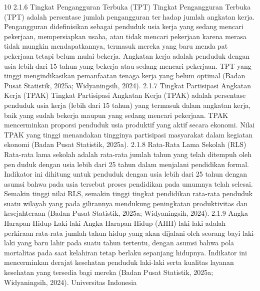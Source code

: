 10
2.1.6 Tingkat Pengangguran Terbuka (TPT)
Tingkat Pengangguran Terbuka (TPT) adalah persentase jumlah pengangguran terhadap jumlah angkatan kerja. Pengangguran didefinisikan sebagai penduduk usia kerja
yang sedang mencari pekerjaan, mempersiapkan usaha, atau tidak mencari pekerjaan
karena merasa tidak mungkin mendapatkannya, termasuk mereka yang baru mendapat pekerjaan tetapi belum mulai bekerja. Angkatan kerja adalah penduduk dengan
usia lebih dari 15 tahun yang bekerja atau sedang mencari pekerjaan. TPT yang tinggi
mengindikasikan pemanfaatan tenaga kerja yang belum optimal (Badan Pusat Statistik,
2025a; Widyaningsih, 2024).
2.1.7 Tingkat Partisipasi Angkatan Kerja (TPAK)
Tingkat Partisipasi Angkatan Kerja (TPAK) adalah persentase penduduk usia kerja
(lebih dari 15 tahun) yang termasuk dalam angkatan kerja, baik yang sudah bekerja maupun
yang sedang mencari pekerjaan. TPAK mencerminkan proporsi penduduk usia produktif
yang aktif secara ekonomi. Nilai TPAK yang tinggi menandakan tingginya partisipasi
masyarakat dalam kegiatan ekonomi (Badan Pusat Statistik, 2025a).
2.1.8 Rata-Rata Lama Sekolah (RLS)
Rata-rata lama sekolah adalah rata-rata jumlah tahun yang telah ditempuh oleh penduduk dengan usia lebih dari 25 tahun dalam menjalani pendidikan formal. Indikator
ini dihitung untuk penduduk dengan usia lebih dari 25 tahun dengan asumsi bahwa pada
usia tersebut proses pendidikan pada umumnya telah selesai. Semakin tinggi nilai RLS,
semakin tinggi tingkat pendidikan rata-rata penduduk suatu wilayah yang pada gilirannya
mendukung peningkatan produktivitas dan kesejahteraan (Badan Pusat Statistik, 2025a;
Widyaningsih, 2024).
2.1.9 Angka Harapan Hidup Laki-laki
Angka Harapan Hidup (AHH) laki-laki adalah perkiraan rata-rata jumlah tahun hidup
yang akan dijalani oleh seorang bayi laki-laki yang baru lahir pada suatu tahun tertentu,
dengan asumsi bahwa pola mortalitas pada saat kelahiran tetap berlaku sepanjang hidupnya.
Indikator ini mencerminkan derajat kesehatan penduduk laki-laki serta kualitas layanan
kesehatan yang tersedia bagi mereka (Badan Pusat Statistik, 2025a; Widyaningsih, 2024).
Universitas Indonesia

